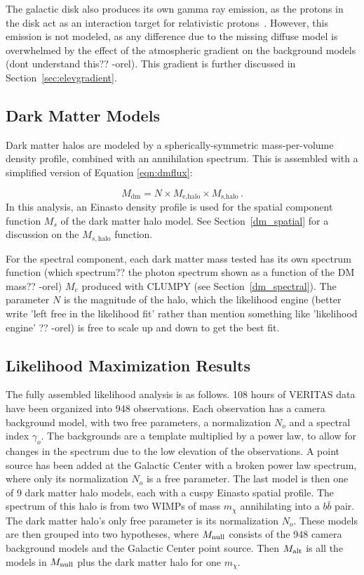   The galactic disk also produces its own gamma ray emission, as the protons in the disk act as an interaction target for relativistic protons~\cite{tevgev_gc_diffuse}.
  However, this emission is not modeled, as any difference due to the missing diffuse model is overwhelmed by the effect of the atmospheric gradient on the background models {\color{red}(dont understand this?? -orel)}.
  This gradient is further discussed in Section~\ref{sec:elevgradient}.
  
  \subsection{Dark Matter Models}\label{subsec:dmhalomodel}
  Dark matter halos are modeled by a spherically-symmetric mass-per-volume density profile, combined with an annihilation spectrum.
  This is assembled with a simplified version of Equation \ref{eqn:dmflux}:
  
  \begin{equation}\label{eqn:dmmodel}
    M_{\textrm{dm}} = N \times M_{\textrm{e,halo}} \times M_{\textrm{s,halo}} \,.
  \end{equation}
  In this analysis, an Einasto density profile is used for the spatial component function $M_s$ of the dark matter halo model.
  See Section~\ref{dm_spatial} for a discussion on the $M_{s,\textrm{halo}}$ function.
  
  For the spectral component, each dark matter mass tested has its own spectrum function {\color{red}(which spectrum?? the photon spectrum shown as a function of the DM mass?? -orel)} $M_e$ produced with CLUMPY (see Section~\ref{dm_spectral}).
  The parameter $N$ is the magnitude of the halo, which the likelihood engine {\color{red}(better write 'left free in the likelihood fit' rather than mention something like 'likelihood engine' ?? -orel)} is free to scale up and down to get the best fit.

  \subsection{Likelihood Maximization Results}\label{like_results}

  The fully assembled likelihood analysis is as follows.
  108 hours of VERITAS data have been organized into 948 observations.
  Each observation has a camera background model, with two free parameters, a normalization $N_o$ and a spectral index $\gamma_o$.
  The backgrounds are a template multiplied by a power law, to allow for changes in the spectrum due to the low elevation of the observations.
  A point source has been added at the Galactic Center with a broken power law spectrum, where only its normalization $N_o$ is a free parameter.
  The last model is then one of 9 dark matter halo models, each with a cuspy Einasto spatial profile.
  The spectrum of this halo is from two WIMPs of mass $m_{\chi}$ annihilating into a $b\bar{b}$ pair.
  The dark matter halo's only free parameter is its normalization $N_o$.
  These models are then grouped into two hypotheses, where $M_\textrm{null}$ consists of the 948 camera background models and the Galactic Center point source.
  Then $M_\textrm{alt}$ is all the models in $M_\textrm{null}$ plus the dark matter halo for one $m_{\chi}$.
  
